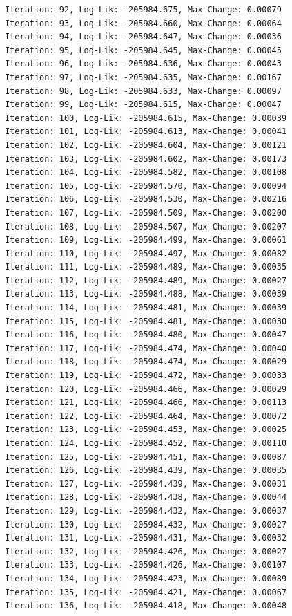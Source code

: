 \documentclass[
  letterpaper,
  DIV=11,
  numbers=noendperiod]{scrreport}
\begin{document}
\begin{verbatim}
Iteration: 92, Log-Lik: -205984.675, Max-Change: 0.00079
Iteration: 93, Log-Lik: -205984.660, Max-Change: 0.00064
Iteration: 94, Log-Lik: -205984.647, Max-Change: 0.00036
Iteration: 95, Log-Lik: -205984.645, Max-Change: 0.00045
Iteration: 96, Log-Lik: -205984.636, Max-Change: 0.00043
Iteration: 97, Log-Lik: -205984.635, Max-Change: 0.00167
Iteration: 98, Log-Lik: -205984.633, Max-Change: 0.00097
Iteration: 99, Log-Lik: -205984.615, Max-Change: 0.00047
Iteration: 100, Log-Lik: -205984.615, Max-Change: 0.00039
Iteration: 101, Log-Lik: -205984.613, Max-Change: 0.00041
Iteration: 102, Log-Lik: -205984.604, Max-Change: 0.00121
Iteration: 103, Log-Lik: -205984.602, Max-Change: 0.00173
Iteration: 104, Log-Lik: -205984.582, Max-Change: 0.00108
Iteration: 105, Log-Lik: -205984.570, Max-Change: 0.00094
Iteration: 106, Log-Lik: -205984.530, Max-Change: 0.00216
Iteration: 107, Log-Lik: -205984.509, Max-Change: 0.00200
Iteration: 108, Log-Lik: -205984.507, Max-Change: 0.00207
Iteration: 109, Log-Lik: -205984.499, Max-Change: 0.00061
Iteration: 110, Log-Lik: -205984.497, Max-Change: 0.00082
Iteration: 111, Log-Lik: -205984.489, Max-Change: 0.00035
Iteration: 112, Log-Lik: -205984.489, Max-Change: 0.00027
Iteration: 113, Log-Lik: -205984.488, Max-Change: 0.00039
Iteration: 114, Log-Lik: -205984.481, Max-Change: 0.00039
Iteration: 115, Log-Lik: -205984.481, Max-Change: 0.00030
Iteration: 116, Log-Lik: -205984.480, Max-Change: 0.00047
Iteration: 117, Log-Lik: -205984.474, Max-Change: 0.00040
Iteration: 118, Log-Lik: -205984.474, Max-Change: 0.00029
Iteration: 119, Log-Lik: -205984.472, Max-Change: 0.00033
Iteration: 120, Log-Lik: -205984.466, Max-Change: 0.00029
Iteration: 121, Log-Lik: -205984.466, Max-Change: 0.00113
Iteration: 122, Log-Lik: -205984.464, Max-Change: 0.00072
Iteration: 123, Log-Lik: -205984.453, Max-Change: 0.00025
Iteration: 124, Log-Lik: -205984.452, Max-Change: 0.00110
Iteration: 125, Log-Lik: -205984.451, Max-Change: 0.00087
Iteration: 126, Log-Lik: -205984.439, Max-Change: 0.00035
Iteration: 127, Log-Lik: -205984.439, Max-Change: 0.00031
Iteration: 128, Log-Lik: -205984.438, Max-Change: 0.00044
Iteration: 129, Log-Lik: -205984.432, Max-Change: 0.00037
Iteration: 130, Log-Lik: -205984.432, Max-Change: 0.00027
Iteration: 131, Log-Lik: -205984.431, Max-Change: 0.00032
Iteration: 132, Log-Lik: -205984.426, Max-Change: 0.00027
Iteration: 133, Log-Lik: -205984.426, Max-Change: 0.00107
Iteration: 134, Log-Lik: -205984.423, Max-Change: 0.00089
Iteration: 135, Log-Lik: -205984.421, Max-Change: 0.00067
Iteration: 136, Log-Lik: -205984.418, Max-Change: 0.00048

\end{verbatim}
\end{document}
